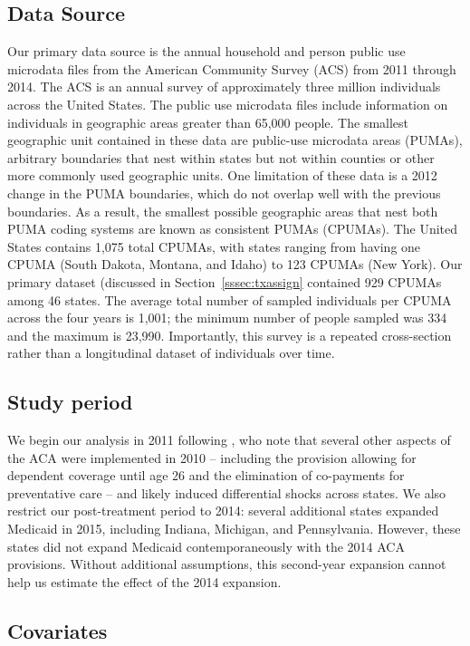 \documentclass[article]{imsart}
\theoremstyle{plain}
\theoremstyle{remark}
\begin{document}
\subsection{Data Source}

Our primary data source is the annual household and person public use microdata files from the American Community Survey (ACS) from 2011 through 2014. The ACS is an annual survey of approximately three million individuals across the United States. The public use microdata files include information on individuals in geographic areas greater than 65,000 people. The smallest geographic unit contained in these data are public-use microdata areas (PUMAs), arbitrary boundaries that nest within states but not within counties or other more commonly used geographic units. One limitation of these data is a 2012 change in the PUMA boundaries, which do not overlap well with the previous boundaries. As a result, the smallest possible geographic areas that nest both PUMA coding systems are known as consistent PUMAs (CPUMAs). The United States contains 1,075 total CPUMAs, with states ranging from having one CPUMA (South Dakota, Montana, and Idaho) to 123 CPUMAs (New York). Our primary dataset (discussed in Section~\ref{sssec:txassign} contained 929 CPUMAs among 46 states. The average total number of sampled individuals per CPUMA across the four years is 1,001; the minimum number of people sampled was 334 and the maximum is 23,990. Importantly, this survey is a repeated cross-section rather than a longitudinal dataset of individuals over time.

\subsection{Study period}

We begin our analysis in 2011 following \cite{courtemanche2017early}, who note that several other aspects of the ACA were implemented in 2010 -- including the provision allowing for dependent coverage until age 26 and the elimination of co-payments for preventative care -- and likely induced differential shocks across states. We also restrict our post-treatment period to 2014: several additional states expanded Medicaid in 2015, including Indiana, Michigan, and Pennsylvania. However, these states did not expand Medicaid contemporaneously with the 2014 ACA provisions. Without additional assumptions, this second-year expansion cannot help us estimate the effect of the 2014 expansion. 

\subsection{Covariates}
\end{document}

